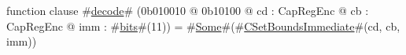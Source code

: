 function clause #\hyperref[sailMIPSzdecode]{decode}# (0b010010 @ 0b10100 @ cd : CapRegEnc @ cb : CapRegEnc @ imm : #\hyperref[sailMIPSzbits]{bits}#(11)) = #\hyperref[sailMIPSzSome]{Some}#(#\hyperref[sailMIPSzCSetBoundsImmediate]{CSetBoundsImmediate}#(cd, cb, imm))
